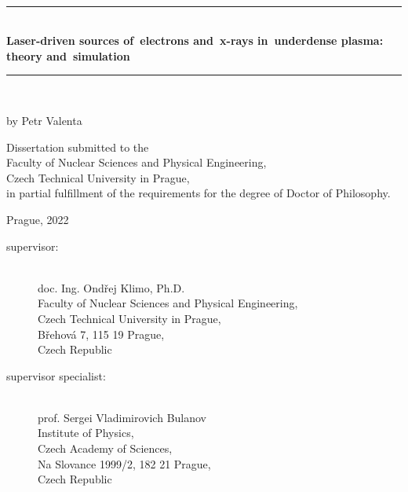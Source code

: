 \documentclass[10pt, twoside, a4paper, openright]{report}
\newcommand{\ctu}{Czech Technical University in Prague}
\newcommand{\fnspe}{Faculty of Nuclear Sciences and Physical Engineering}
\newcommand{\projecttitle}{Laser-driven sources of~electrons and~x-rays in~underdense plasma: theory and~simulation}
\newcommand{\klimo}{doc. Ing. Ondřej Klimo, Ph.D.}
\newcommand{\bulanov}{prof. Sergei Vladimirovich Bulanov}
\begin{document}
\pagestyle{empty}


\mbox{}
\newpage

\begin{titlepage}

\begin{center}
\epsfysize=35mm  \\[15mm]
\end{center}

\begin{center}
\begin{spacing}{2.0}
{\rule{125mm}{2pt}} \\[4mm]
{\huge \bf \projecttitle} \\
{\rule{125mm}{2pt}} \\[5mm]
\end{spacing}
{\LARGE by Petr Valenta} \\
\end{center}

\vfill

\begin{center}
\parbox{0.75\textwidth}{\noindent \centering \large Dissertation submitted to the \\ \fnspe, \\ \ctu, \\ in partial fulfillment of the requirements for the degree of Doctor of Philosophy.}
\end{center}

\vfill

\begin{center}
{\large Prague, 2022}
\end{center}

\end{titlepage}


\newpage
\rule{0pt}{0pt}
\vfill
\begin{description}
	\item[supervisor:]\ \\
	\klimo \\
	\fnspe, \\ 
	\ctu, \\
	Břehová 7, 115 19 Prague, \\
	Czech Republic
\end{description}

\begin{description}
	\item[supervisor specialist:]\ \\
	\bulanov \\
	Institute of Physics, \\
	Czech Academy of Sciences, \\
	Na Slovance 1999/2, 182 21 Prague, \\
	Czech Republic
\end{description}
\vglue 1cm
\end{document}
